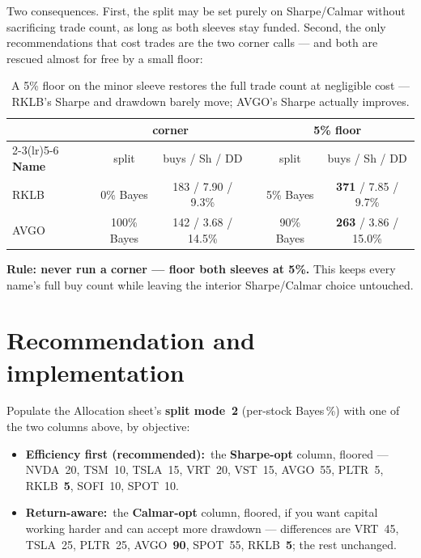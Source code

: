\documentclass[11pt]{article}
\newcommand{\kpi}[2]{\textbf{#1}\,{\footnotesize\color{bcgrey}#2}}
\begin{document}
Two consequences. First, the split may be set purely on Sharpe/Calmar without sacrificing trade
count, as long as both sleeves stay funded. Second, the only recommendations that cost trades
are the two corner calls --- and both are rescued almost for free by a small floor:

\begin{table}[h]\centering\small
\renewcommand{\arraystretch}{1.15}
\begin{tabular}{l cc c cc}
\toprule
& \multicolumn{2}{c}{\textbf{corner}} & & \multicolumn{2}{c}{\textbf{5\% floor}}\\
\cmidrule(lr){2-3}\cmidrule(lr){5-6}
\textbf{Name} & split & buys / Sh / DD & & split & buys / Sh / DD\\
\midrule
RKLB & 0\% Bayes   & 183 / 7.90 / 9.3\%  & & 5\% Bayes  & \textbf{371} / 7.85 / 9.7\%\\
AVGO & 100\% Bayes & 142 / 3.68 / 14.5\% & & 90\% Bayes & \textbf{263} / 3.86 / 15.0\%\\
\bottomrule
\end{tabular}
\caption*{\footnotesize A 5\% floor on the minor sleeve restores the full trade count at
negligible cost --- RKLB's Sharpe and drawdown barely move; AVGO's Sharpe actually improves.}
\end{table}

\textbf{Rule: never run a corner --- floor both sleeves at 5\%.} This keeps every name's full
buy count while leaving the interior Sharpe/Calmar choice untouched.

\section{Recommendation and implementation}

Populate the Allocation sheet's \textbf{split mode~2} (per-stock Bayes\,\%) with one of the two
columns above, by objective:

\begin{itemize}[leftmargin=1.4em,itemsep=2pt]
  \item \kpi{Efficiency first (recommended):}{} the \textbf{Sharpe-opt} column, floored ---
        NVDA~20, TSM~10, TSLA~15, VRT~20, VST~15, AVGO~55, PLTR~5, RKLB~\textbf{5}, SOFI~10,
        SPOT~10.
  \item \kpi{Return-aware:}{} the \textbf{Calmar-opt} column, floored, if you want capital
        working harder and can accept more drawdown --- differences are VRT~45, TSLA~25, PLTR~25,
        AVGO~\textbf{90}, SPOT~55, RKLB~\textbf{5}; the rest unchanged.
\end{itemize}
\end{document}
